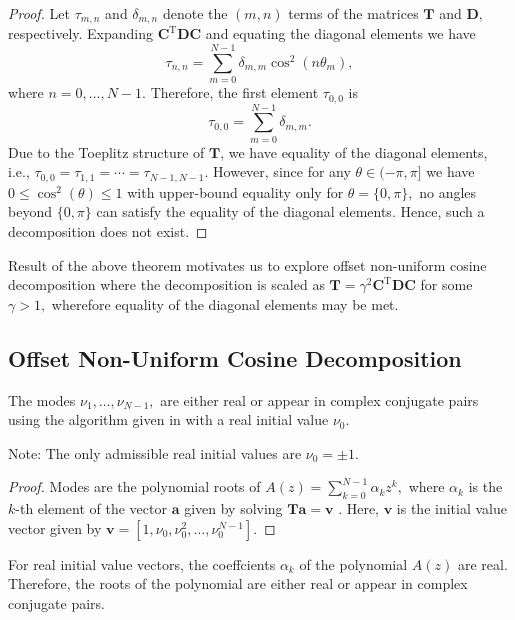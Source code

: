 \begin{proof}
Let $\tau_{m,n}$ and $\delta_{ m,n}$ denote the $(m,n)$ terms of the matrices $\boldsymbol{T}$ and $\boldsymbol{D},$ respectively. Expanding $\boldsymbol{C}^\text{T} \boldsymbol{D} \boldsymbol{C}$ and equating the diagonal elements we have \[ \tau_{n,n} = \sum_{m=0}^{N-1} \delta_{m,m} \cos^2 (n \theta_m),\]
where $n = 0,\dots,N-1.$ Therefore, the first element $\tau_{0,0}$ is \[\tau_{0,0} = \sum_{m=0}^{N-1} \delta_{m,m}.\] Due to the Toeplitz structure of $\boldsymbol{T}$, we have equality of the diagonal elements, i.e., $\tau_{0,0} = \tau_{1,1} = \cdots = \tau_{N-1,N-1}.$ However, since for any $\theta \in (-\pi,\pi]$ we have $0 \leq \cos^2 (\theta ) \leq 1$ with upper-bound equality only for $\theta = \{0,\pi\},$ no angles beyond $\{0,\pi\}$ can satisfy the equality of the diagonal elements. Hence, such a decomposition does not exist.
\end{proof}

Result of the above theorem motivates us to explore offset non-uniform cosine decomposition where the decomposition is scaled as $\boldsymbol{T} = \gamma^2 \boldsymbol{C}^\text{T} \boldsymbol{D} \boldsymbol{C}$ for some  $\gamma > 1,$ wherefore equality of the diagonal elements may be met.

\subsection{Offset Non-Uniform Cosine Decomposition}

\begin{lemma}
\label{lem:012_modes}
The modes $\nu_1, \dots, \nu_{N-1},$ are either real or appear in complex conjugate pairs using the algorithm given in \cite{Backstrom2013} with a real initial value $\nu_0.$
\end{lemma}

Note: The only admissible real initial values are $\nu_0 = \pm 1.$

\begin{proof}
Modes are the polynomial roots of $A(z) = \sum_{k=0}^{N-1} \alpha_k z^k,$ where $\alpha_ k$ is the $k$-th element of the vector $\boldsymbol{a}$ given by solving $\boldsymbol{Ta} = \boldsymbol{v}$ \cite{Backstrom2013}. Here, $\boldsymbol{v}$ is the initial value vector given by $\boldsymbol{v} = [1, \nu_0, \nu_0^2,\dots,\nu_0^{N-1}].$
\end{proof}

For real initial value vectors, the coeffcients $\alpha_k$ of the polynomial $A(z)$ are real. Therefore, the roots of the polynomial are either real or appear in complex conjugate pairs.

